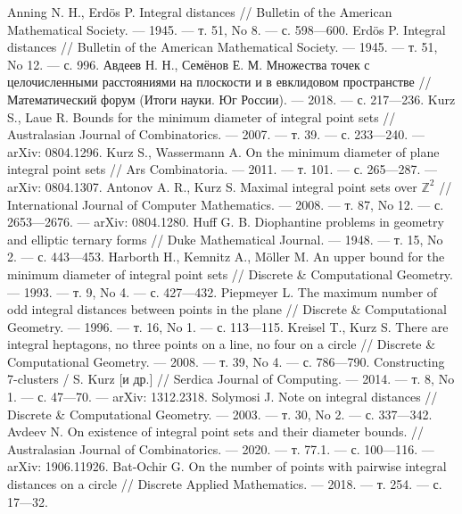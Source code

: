\begin{thebibliography}{99}
Anning N. H., Erdös P. Integral distances // Bulletin of the American Mathematical
Society. — 1945. — т. 51, No 8. — с. 598—600.
Erdös P. Integral distances // Bulletin of the American Mathematical Society. — 1945. —
т. 51, No 12. — с. 996.
Авдеев Н. Н., Семёнов Е. М. Множества точек с целочисленными расстояниями на
плоскости и в евклидовом пространстве // Математический форум (Итоги науки. Юг
России). — 2018. — с. 217—236.
Kurz S., Laue R. Bounds for the minimum diameter of integral point sets // Australasian
Journal of Combinatorics. — 2007. — т. 39. — с. 233—240. — arXiv: 0804.1296.
Kurz S., Wassermann A. On the minimum diameter of plane integral point sets // Ars
Combinatoria. — 2011. — т. 101. — с. 265—287. — arXiv: 0804.1307.
Antonov A. R., Kurz S. Maximal integral point sets over $\mathbb{Z}^2$ // International Journal of
Computer Mathematics. — 2008. — т. 87, No 12. — с. 2653—2676. — arXiv: 0804.1280.
Huff G. B. Diophantine problems in geometry and elliptic ternary forms // Duke
Mathematical Journal. — 1948. — т. 15, No 2. — с. 443—453.
Harborth H., Kemnitz A., Möller M. An upper bound for the minimum diameter of integral
point sets // Discrete \& Computational Geometry. — 1993. — т. 9, No 4. — с. 427—432.
Piepmeyer L. The maximum number of odd integral distances between points in the plane //
Discrete \& Computational Geometry. — 1996. — т. 16, No 1. — с. 113—115.
Kreisel T., Kurz S. There are integral heptagons, no three points on a line, no four on a
circle // Discrete \& Computational Geometry. — 2008. — т. 39, No 4. — с. 786—790.
Constructing 7-clusters / S. Kurz [и др.] // Serdica Journal of Computing. — 2014. — т. 8,
No 1. — с. 47—70. — arXiv: 1312.2318.
Solymosi J. Note on integral distances // Discrete \& Computational Geometry. — 2003. —
т. 30, No 2. — с. 337—342.
Avdeev N. On existence of integral point sets and their diameter bounds. //
Australasian Journal of Combinatorics. — 2020. — т. 77.1. — с. 100—116. — arXiv: 1906.11926.
Bat-Ochir G. On the number of points with pairwise integral distances on a circle // Discrete
Applied Mathematics. — 2018. — т. 254. — с. 17—32.

\end{thebibliography}

